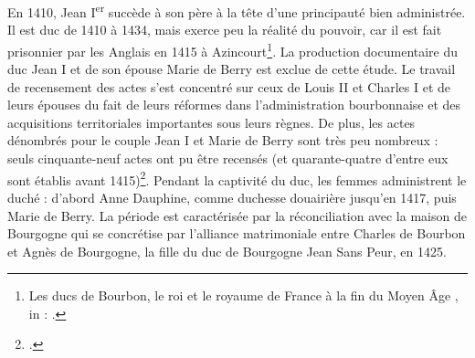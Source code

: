\par En 1410, Jean I\textsuperscript{er} succède à son père à la tête d’une principauté bien administrée. Il est duc de 1410 à 1434, mais exerce peu la réalité du pouvoir, car il est fait prisonnier par les Anglais en 1415 à Azincourt\footnote{\og Les ducs de Bourbon, le roi et le royaume de France à la fin du Moyen Âge \fg, in : \cite{matteoniBourbonsLeurBibliotheque2022}.}. La production documentaire du duc Jean I et de son épouse Marie de Berry est exclue de cette étude. Le travail de recensement des actes s'est concentré sur ceux de Louis II et Charles I et de leurs épouses du fait de leurs réformes dans l'administration bourbonnaise et des acquisitions territoriales importantes sous leurs règnes. De plus, les actes dénombrés pour le couple Jean I et Marie de Berry sont très peu nombreux : seuls cinquante-neuf actes ont pu être recensés (et quarante-quatre d'entre eux sont établis avant 1415)\footnote{\cite{generoChancellerieCharlesIer2018}.}. Pendant la captivité du duc, les femmes administrent le duché : d’abord Anne Dauphine, comme duchesse douairière jusqu’en 1417, puis Marie de Berry. La période est caractérisée par la réconciliation avec la maison de Bourgogne qui se concrétise par l'alliance matrimoniale entre Charles de Bourbon et Agnès de Bourgogne, la fille du duc de Bourgogne Jean Sans Peur, en 1425. 
\newline 


